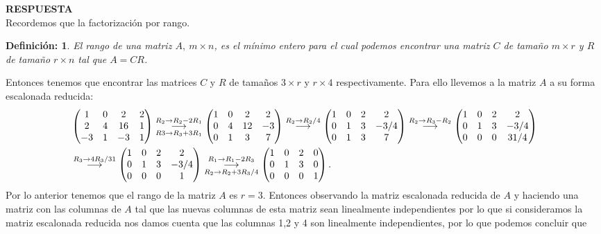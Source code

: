 \documentclass[11pt,letterpaper]{article}
\newcommand{\res}{\textbf{RESPUESTA}\\}
\newcommand{\grstep}[2][\relax]{%
   \ensuremath{\mathrel{
       {\mathop{\longrightarrow}\limits^{#2\mathstrut}_{
                                     \begin{subarray}{l} #1 \end{subarray}}}}}}
\newtheorem{thmd}{Definición:}
\begin{document}
\begin{enumerate}
\res Recordemos que la factorización por rango.
\begin{framed}
    \begin{thmd} \label{factorizacion_rango}
	El rango de una matriz $A,\ m\times n$, es el mínimo entero para el cual podemos encontrar una matriz $C$ de tamaño $m\times r$ y $R$ de tamaño $r\times n$ tal que $A=CR$. 
    \end{thmd}
\end{framed}
Entonces tenemos que encontrar las matrices $C$ y $R$ de tamaños $3\times r$ y $r\times 4$ respectivamente. Para ello llevemos a la matriz $A$ a su forma escalonada reducida:
\begin{align*}
&\begin{pmatrix}
 1 & 0 & 2 & 2\\
 2 & 4 &16 & 1\\
-3 & 1 &-3 & 1
\end{pmatrix}%
\grstep[R3 \rightarrow R_3+3R_1]{R_2 \rightarrow R_2-2R_1}
%
\begin{pmatrix}
 1 & 0 & 2 & 2\\
 0 & 4 &12 &-3\\
 0 & 1 & 3 & 7
\end{pmatrix}%
\grstep[]{R_2 \rightarrow R_2/4}
%
\begin{pmatrix}
 1 & 0 & 2 & 2\\
 0 & 1 & 3 &-3/4\\
 0 & 1 & 3 & 7
\end{pmatrix}%
\grstep[]{R_2 \rightarrow R_3-R_2}
%
\begin{pmatrix}
 1 & 0 & 2 & 2\\
 0 & 1 & 3 &-3/4\\
 0 & 0 & 0 & 31/4
\end{pmatrix}\\
&\grstep[]{R_3 \rightarrow 4R_3/31}
%
\begin{pmatrix}
 1 & 0 & 2 & 2\\
 0 & 1 & 3 &-3/4\\
 0 & 0 & 0 & 1
\end{pmatrix}%
\grstep[R_2\rightarrow R_2+3R_3/4]{R_1 \rightarrow R_1-2R_3}
%
\begin{pmatrix}
 1 & 0 & 2 & 0\\
 0 & 1 & 3 & 0\\
 0 & 0 & 0 & 1
\end{pmatrix}.
\end{align*}
Por lo anterior tenemos que el rango de la matriz $A$ es $r=3$. Entonces observando la matriz escalonada reducida de $A$ y haciendo una matriz con las columnas de $A$ tal que las nuevas columnas de esta matriz sean linealmente independientes por lo que si consideramos la matriz escalonada reducida nos damos cuenta que las columnas 1,2 y 4 son linealmente independientes, por lo que podemos concluir que 

\end{enumerate}
\end{document}
